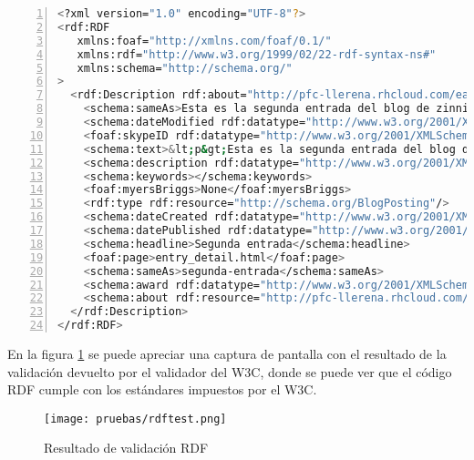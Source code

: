\begin{lstlisting}[frame=L, language=bash, basicstyle=\footnotesize, breaklines=true, numbers=left]
<?xml version="1.0" encoding="UTF-8"?>
<rdf:RDF
   xmlns:foaf="http://xmlns.com/foaf/0.1/"
   xmlns:rdf="http://www.w3.org/1999/02/22-rdf-syntax-ns#"
   xmlns:schema="http://schema.org/"
>
  <rdf:Description rdf:about="http://pfc-llerena.rhcloud.com/easydata/publish/instance/zinnia/BlogPosting-Entry/2.xml">
    <schema:sameAs>Esta es la segunda entrada del blog de zinnia.Ten mucha suerte en tu Proyecto Fin de Carrera.</schema:sameAs>
    <schema:dateModified rdf:datatype="http://www.w3.org/2001/XMLSchema#dateTime">2013-12-01T11:36:17.142964</schema:dateModified>
    <foaf:skypeID rdf:datatype="http://www.w3.org/2001/XMLSchema#integer">2</foaf:skypeID>
    <schema:text>&lt;p&gt;Esta es la segunda entrada del blog de zinnia.&lt;/p&gt;&lt;p&gt;Ten mucha suerte en tu Proyecto Fin de Carrera.&lt;/p&gt;</schema:text>
    <schema:description rdf:datatype="http://www.w3.org/2001/XMLSchema#boolean">false</schema:description>
    <schema:keywords></schema:keywords>
    <foaf:myersBriggs>None</foaf:myersBriggs>
    <rdf:type rdf:resource="http://schema.org/BlogPosting"/>
    <schema:dateCreated rdf:datatype="http://www.w3.org/2001/XMLSchema#dateTime">2013-12-01T11:35:33</schema:dateCreated>
    <schema:datePublished rdf:datatype="http://www.w3.org/2001/XMLSchema#dateTime">2013-12-01T11:36:11</schema:datePublished>
    <schema:headline>Segunda entrada</schema:headline>
    <foaf:page>entry_detail.html</foaf:page>
    <schema:sameAs>segunda-entrada</schema:sameAs>
    <schema:award rdf:datatype="http://www.w3.org/2001/XMLSchema#integer">0</schema:award>
    <schema:about rdf:resource="http://pfc-llerena.rhcloud.com/easydata/publish/instance/zinnia/BlogPosting-Entry/1.xml"/>
  </rdf:Description>
</rdf:RDF>
\end{lstlisting}

En la figura \ref{fig:rdftest} se puede apreciar una captura de pantalla con el
resultado de la validación devuelto por el validador del W3C, donde se puede
ver que el código RDF cumple con los estándares impuestos por el W3C.

\newpage

\begin{figure}[H]
    \begin{center}
        \texttt{[image: pruebas/rdftest.png]}
    \end{center}
    \caption{Resultado de validación RDF}
    \label{fig:rdftest}
\end{figure}


